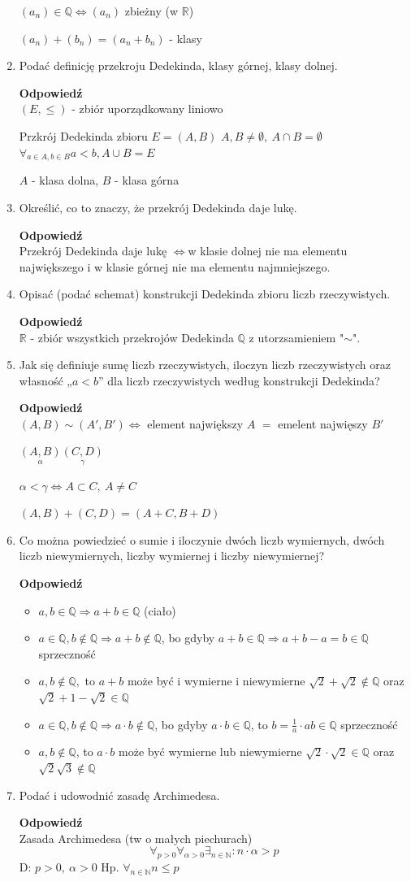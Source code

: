 \documentclass[12pt,a4paper]{article}
\theoremstyle{break}
\newcommand{\Odp}[1]{
		\begin{mdframed}[style=zadanie]
			\textbf{Odpowiedź}\\
			#1
		\end{mdframed}
	}
\newcommand{\witw}{$\Leftrightarrow$}
\begin{document}
\begin{enumerate}[1.]
{		$(a_n)\in \mathbb{Q} \Leftrightarrow (a_n)$ zbieżny (w $\mathbb{R}$)
		
		$(a_n)+(b_n)=(a_n + b_n)$ - klasy
	}
	\newpage
	\item Podać definicję przekroju Dedekinda, klasy górnej, klasy dolnej.
	\Odp{
		$(E,\leq)$ - zbiór uporządkowany liniowo
		
		Przkrój Dedekinda zbioru $E=(A,B)$
		$A,B\neq \emptyset, \: A\cap B = \emptyset$
		$\forall_{a\in A, b\in B} a<b, A\cup B=E$
		
		$A$ - klasa dolna, $B$ - klasa górna
	}
	
	\item Określić, co to znaczy, że przekrój Dedekinda daje lukę.
	\Odp{
		Przekrój Dedekinda daje lukę \witw w klasie dolnej nie ma elementu największego i w klasie górnej nie ma elementu najmniejszego.
	}
	
	\item Opisać (podać schemat) konstrukcji Dedekinda zbioru liczb rzeczywistych.
	\Odp{
		$\mathbb{R}$ - zbiór wszystkich przekrojów Dedekinda $\mathbb{Q}$ z utorzsamieniem "$\sim$".
	}
	
	\item Jak się definiuje sumę liczb rzeczywistych, iloczyn liczb rzeczywistych oraz własność	„$a < b$” dla liczb rzeczywistych według konstrukcji Dedekinda?
	\Odp{
		$(A,B) \sim (A',B') \Leftrightarrow$ element największy $A$ $=$ emelent najwięszy $B'$
		
		$\underset{\alpha}{(A,B)} \underset{\gamma}{(C,D)}$ 
		
		$\alpha<\gamma \Leftrightarrow A\subset C,\: A\neq C$
		
		$(A,B) + (C,D) = (A+C, B + D)$
	}
	
	\item Co można powiedzieć o sumie i iloczynie dwóch liczb wymiernych, dwóch liczb niewymiernych, liczby wymiernej i liczby niewymiernej?
	\Odp{
	\begin{itemize}
		\item $a,b\in \mathbb{Q} \Rightarrow a+b\in \mathbb{Q}$ (ciało)
		\item $a\in \mathbb{Q}, b\notin \mathbb{Q} \Rightarrow a+b\notin\mathbb{Q}$, bo gdyby $a+b\in \mathbb{Q} \Rightarrow a+b-a=b\in\mathbb{Q}$ sprzeczność
		\item $a,b\notin\mathbb{Q},$ to $a+b$ może być i wymierne i niewymierne
		$\sqrt{2}+\sqrt{2}\notin\mathbb{Q}$ oraz $\sqrt{2}+1-\sqrt{2}\in \mathbb{Q}$
		\item $a\in\mathbb{Q}, b\notin\mathbb{Q} \Rightarrow a\cdot b \notin \mathbb{Q}$, bo gdyby $a\cdot b \in \mathbb{Q}$, to $b=\frac{1}{a} \cdot ab \in \mathbb{Q}$ sprzeczność
		\item $a,b\notin\mathbb{Q}$, to $a\cdot b$ może być wymierne lub niewymierne
		$\sqrt{2}\cdot\sqrt{2}\in \mathbb{Q}$ oraz $\sqrt{2}\sqrt{3}\notin\mathbb{Q}$
	\end{itemize}
	}
	\newpage
	\item Podać i udowodnić zasadę Archimedesa.
	\Odp{
		Zasada Archimedesa (tw o małych piechurach)
		$$\forall_{p>0} \forall_{\alpha>0} \exists_{n\in\mathbb{N}} : n\cdot\alpha>p$$
		D: $p>0, \: \alpha>0$
		Hp. $\forall_{n\in\mathbb{N}} n\leq p$
		
}
\end{enumerate}
\end{document}
